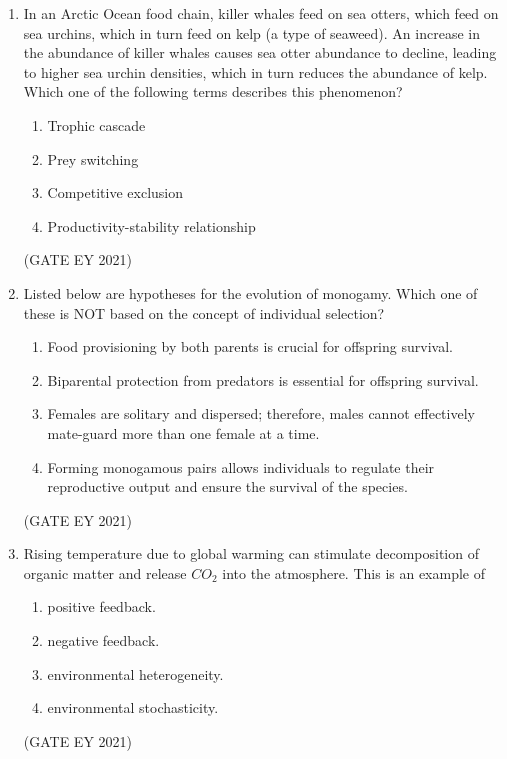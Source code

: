 \documentclass[journal]{IEEEtran}
\begin{document}
\begin{enumerate}
    \item In an Arctic Ocean food chain, killer whales feed on sea otters, which feed on sea urchins, which in turn feed on kelp (a type of seaweed). An increase in the abundance of killer whales causes sea otter abundance to decline, leading to higher sea urchin densities, which in turn reduces the abundance of kelp. Which one of the following terms describes this phenomenon?
    \begin{multicols}{2}
    \begin{enumerate}
        \item Trophic cascade
        \item Prey switching
        \item Competitive exclusion
        \item Productivity-stability relationship
    \end{enumerate}
    \end{multicols}
    \hfill{(GATE EY 2021)}

    \item Listed below are hypotheses for the evolution of monogamy. Which one of these is NOT based on the concept of individual selection?
    \begin{enumerate}
        \item Food provisioning by both parents is crucial for offspring survival.
        \item Biparental protection from predators is essential for offspring survival.
        \item Females are solitary and dispersed; therefore, males cannot effectively mate-guard more than one female at a time.
        \item Forming monogamous pairs allows individuals to regulate their reproductive output and ensure the survival of the species.
    \end{enumerate}
    \hfill{(GATE EY 2021)}

    \item Rising temperature due to global warming can stimulate decomposition of organic matter and release $CO_2$ into the atmosphere. This is an example of
    \begin{multicols}{2}
    \begin{enumerate}
        \item positive feedback.
        \item negative feedback.
        \item environmental heterogeneity.
        \item environmental stochasticity.
    \end{enumerate}
    \end{multicols}
    \hfill{(GATE EY 2021)}


\end{enumerate}
\end{document}
